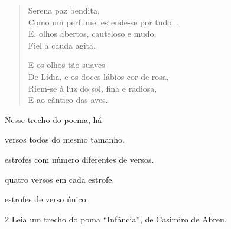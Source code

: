 \begin{myquote}
\begin{verse}
Serena paz bendita,\\
Como um perfume, estende‑se por tudo...\\
E, olhos abertos, cauteloso e mudo,\\
Fiel a cauda agita.

E os olhos tão suaves\\
De Lídia, e os doces lábios cor de rosa,\\
Riem‑se à luz do sol, fina e radiosa,\\
E ao cântico das aves.
\end{verse}


\end{myquote}

Nesse trecho do poema, há

\begin{escolha}[itemsep=-5pt]
\item versos todos do mesmo tamanho.

\item estrofes com número diferentes de versos.

\item quatro versos em cada estrofe.

\item estrofes de verso único.
\end{escolha}

\pagebreak
\num{2} Leia um trecho do poma ``Infância'', de Casimiro de Abreu.

